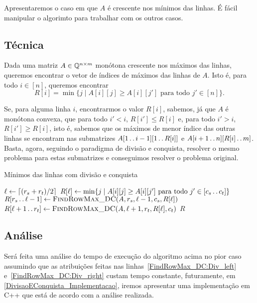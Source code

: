Apresentaremos o caso em que $A$ é crescente nos mínimos das linhas. É fácil manipular o algorimto para trabalhar com os outros casos.


\subsection{Técnica}
Dada uma matriz $A \in \mathbb{Q}^{n \times m}$ monótona crescente nos máximos das linhas, queremos encontrar o vetor de índices de máximos das linhas de $A$. Isto é, para todo $i \in [n]$, queremos encontrar
$$ R[i] = \min\{j \mid A[i][j] \geq A[i][j'] \text{ para todo } j' \in [n]\} \text{.}$$  

Se, para alguma linha $i$, encontrarmos o valor $R[i]$, sabemos, já que $A$ é monótona convexa, que para todo $i' < i$, $R[i'] \leq R[i]$ e, para todo $i' > i$, $R[i'] \geq R[i]$, isto é, sabemos que os máximos de menor índice das outras linhas se encontram nas submatrizes $A[1 \,.\,.\, i-1][1 \,.\,.\, R[i]]$ e $A[i+1 \,.\,.\, n][R[i] \,.\,.\, m]$. Basta, agora, seguindo o paradigma de divisão e conquista, resolver o mesmo problema para estas submatrizes e conseguimos resolver o problema original. 

\newcommand{\FRMDC}{\textsc{FindRowMax\_DC}}
\begin{algorithm}[H]
\caption{Mínimos das linhas com divisão e conquista}
\label{FindRowMax_DC}
\begin{algorithmic}[1]
\Function{\FRMDC}{A, r_s, r_t, c_s, c_t}
    \State $\ell \leftarrow \lceil(r_s+r_t)/2\rceil$
    \State $R[\ell] \leftarrow \min\{j \mid A[i][j] \geq A[i][j'] \text{ para todo } j' \in [c_s \,.\,.\, c_t]\}$
        \State $R[r_s \tdots \ell-1] \rec \FRMDC(A, r_s, \ell-1, c_s, R[\ell])$ \label{FindRowMax_DC:Div_left}
    \EndIf
        \State $R[\ell+1 \tdots r_t] \rec \FRMDC(A, \ell+1, r_t, R[\ell], c_t)$ \label{FindRowMax_DC:Div_right}
    \EndIf
    \State \Return $R$
\EndFunction
\end{algorithmic}
\end{algorithm}

\subsection{Análise}
Será feita uma análise do tempo de execução do algoritmo acima no pior caso assumindo que as atribuições feitas nas linhas~\ref{FindRowMax_DC:Div_left} e~\ref{FindRowMax_DC:Div_right} custam tempo constante, futuramente, em \ref{DivisaoEConquista_Implementacao}, iremos apresentar uma implementação em C++ que está de acordo com a análise realizada.  

